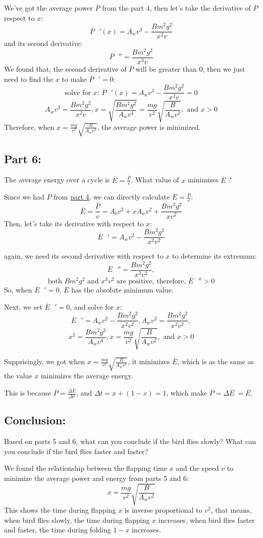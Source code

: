 \documentclass{article}
\begin{document}
We've got the average power \(\overline{P}\) from the part 4, then let's take the derivative of \(\overline{P}\) respect to \(x\):
\[\overline{P}\text{ }'(x)= A_wv^3-\frac{Bm^2g^2}{x^2v}\]
and its second derivative:
\[\overline{P}\text{ }'' = \frac{Bm^2g^2}{x^3v}\]
We found that, the second derivative of \(\overline{P}\) will be greater than \(0\), then we just need to find the \(x\) to make  \(\overline{P}\text{ }' = 0\):
\[\text{solve for }x \text{: }\overline{P}\text{ }'(x)= A_wv^3-\frac{Bm^2g^2}{x^2v} =0 \]
\[A_wv^3 = \frac{Bm^2g^2}{x^2v}, x = \sqrt{\frac{Bm^2g^2}{A_wv^4}} = \frac{mg}{v^2}\sqrt{\frac{B}{A_wv^2}},\text{ and }x > 0\]
Therefore, when \(x = \frac{mg}{v^2}\sqrt{\frac{B}{A_wv^2}}\), the average power is minimized.

\subsection*{Part 6:}
The average energy over a cycle is \(\overline{E} = \frac{\overline{P}}{v}\). What value of \(x\) minimizes \(\overline{E}\) ?

Since we had \(\overline{P}\) from \hyperref[sec:part4]{part 4}, we can directly calculate \(\overline{E} = \frac{\overline{P}}{v}\):
\[\overline{E} = \frac{\overline{P}}{v}=  A_bv^2+xA_wv^2 + \frac{Bm^2g^2}{xv^2} \]
Then, let's take its derivative with respect to \(x\):
\[\overline{E}\text{ }' = A_wv^2-\frac{Bm^2g^2}{x^2v^2}\]

again, we need its second derivative with respect to \(x\) to determine its extremum:
\[\overline{E}\text{ }'' = \frac{Bm^2g^2}{x^3v^2},\]
\[\text{both }Bm^2g^2 \text{ and } x^3v^2 \text{ are positive, therefore, } \overline{E} \text{ }'' > 0\]
So, when \(\overline{E}\text{ }' = 0\), \(\overline{E}\) has the absolute minimum value.

Next, we set \(\overline{E}\text{ }' = 0\), and solve for \(x\):
\[\overline{E}\text{ }' = A_wv^2-\frac{Bm^2g^2}{x^2v^2}, A_wv^2 = \frac{Bm^2g^2}{x^2v^2},\]
\[x^2=\frac{Bm^2g^2}{A_wv^4}, x = \frac{mg}{v^2}\sqrt{\frac{B}{A_wv^2}},\text{ and }x > 0\]

Supprisingly, we got when \(x = \frac{mg}{v^2}\sqrt{\frac{B}{A_wv^2}}\), it minimizes \(\overline{E}\), which is as the same as the value \(x\) minimizes the average energy.

This is because \(\overline{P}= \frac{{\Delta \overline{E}}}{\Delta t}\), and \(\Delta t = x + (1-x) =1\), which make \(\overline{P} = \Delta \overline{E}\ = \overline{E}\).

\subsection*{Conclusion:}
Based on parts 5 and 6, what can you conclude if the bird flies slowly? What can you conclude if the bird flies faster and faster?

We found the relationship between the flapping time \(x\) and the speed \(v\) to minimize the average power and energy from parts 5 and 6:
\[x = \frac{mg}{v^2}\sqrt{\frac{B}{A_wv^2}}\]
This shows the time during flapping \(x\) is inverse proportional to \(v^2\), that means, when bird flies slowly, the time during flapping \(x\) increases, when bird flies faster and faster, the time during folding \(1-x\) increases.
\end{document}
